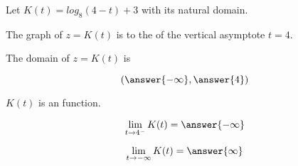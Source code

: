 \documentclass{ximera}
\author{Lee Wayand}
\begin{document}
\begin{exercise}






Let $K(t) = log_8(4-t) + 3$ with its natural domain. \\





\begin{question}


The graph of $z = K(t)$ is to the  of the vertical asymptote $t = 4$.


\end{question}





\begin{question}


The domain of $z = K(t)$ is 

\[
\left( \answer{-\infty}, \answer{4} \right)
\]


\end{question}






\begin{question}


$K(t)$ is an  function.


\end{question}











\begin{question}


\[
\lim\limits_{t \to 4^-} K(t) = \answer{-\infty}
\]


\end{question}








\begin{question}


\[
\lim\limits_{t \to -\infty} K(t) = \answer{\infty}
\]


\end{question}










\end{exercise}
\end{document}
